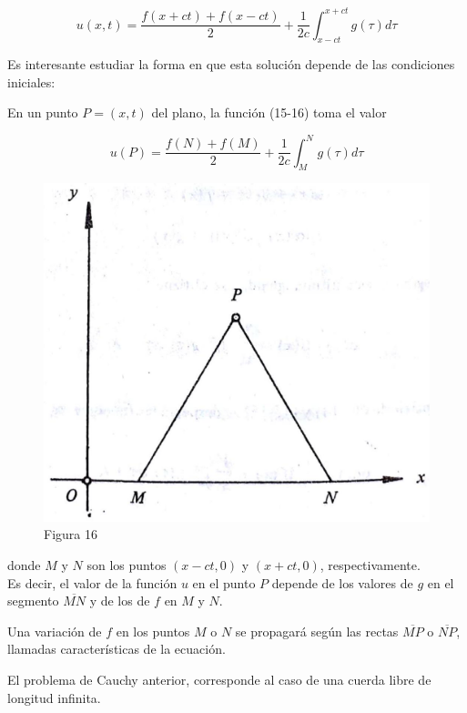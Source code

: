 \documentclass[10pt]{article}
\theoremstyle{plain}
\theoremstyle{definition}
\theoremstyle{remark}
\begin{document}
\begin{equation*}
u(x, t)=\frac{f(x+c t)+f(x-c t)}{2}+\frac{1}{2 c} \int_{x-c t}^{x+c t} g(\tau) d \tau \tag{15-16}
\end{equation*}


Es interesante estudiar la forma en que esta solución depende de las condiciones iniciales:

En un punto $P=(x, t)$ del plano, la función (15-16) toma el valor

$$
u(P)=\frac{f(N)+f(M)}{2}+\frac{1}{2 c} \int_{M}^{N} g(\tau) d \tau
$$

\begin{figure}[h]
\begin{center}
  \includegraphics[width=\textwidth]{2025_09_05_adecef5eb2053bc129b5g-357}
\captionsetup{labelformat=empty}
\caption{Figura 16}
\end{center}
\end{figure}

donde $M$ y $N$ son los puntos $(x-c t, 0)$ y $(x+c t, 0)$, respectivamente.\\
Es decir, el valor de la función $u$ en el punto $P$ depende de los valores de $g$ en el segmento $\overline{M N}$ y de los de $f$ en $M$ y $N$.

Una variación de $f$ en los puntos $M$ o $N$ se propagará según las rectas $\overline{M P}$ o $\overline{N P}$, llamadas características de la ecuación.

El problema de Cauchy anterior, corresponde al caso de una cuerda libre de longitud infinita.
\end{document}

